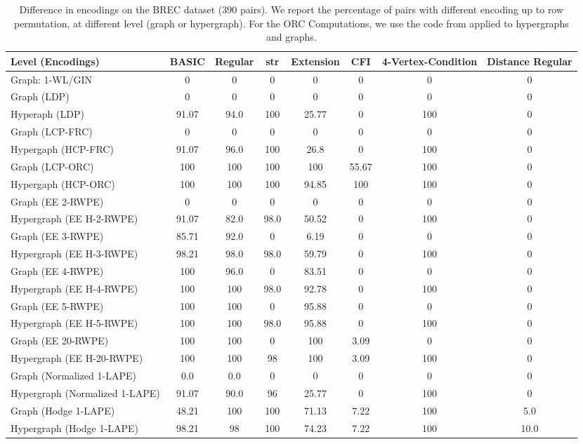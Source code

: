 \begin{table}[H]
\centering
\tiny
\begin{tabular}{|l|c|c|c|c|c|c|c|}
\hline
\textbf{Level (Encodings)} & \textbf{BASIC} & \textbf{Regular} & \textbf{str} & \textbf{Extension} & \textbf{CFI} & \textbf{4-Vertex-Condition} & \textbf{Distance Regular} \\
\hline
Graph: 1-WL/GIN & 0 & 0 & 0 & 0 & 0 & 0 & 0 \\
\hline
Graph (LDP) & 0 & 0 & 0 & 0 & 0 & 0 & 0  \\
Hyperaph (LDP) & 91.07 & 94.0  & 100 & 25.77  & 0 & 100 & 0  \\
\hline
Graph (LCP-FRC) & 0 & 0 & 0 & 0 & 0 & 0 & 0 \\
Hypergaph (HCP-FRC) & 91.07 & 96.0  & 100 & 26.8 & 0 & 100 & 0  \\
\hline
Graph (LCP-ORC) &  100 & 100 & 100 & 100 & 55.67 & 100 &0  \\
Hypergaph (HCP-ORC) & 100 & 100   & 100  & 94.85  & 100  &  100 &   0 \\
\hline
Graph (EE 2-RWPE) & 0 & 0 & 0 & 0 & 0 & 0 & 0 \\
Hypergraph (EE H-2-RWPE) & 91.07 & 82.0  & 98.0 & 50.52 & 0  & 100 & 0 \\
\hline
Graph (EE 3-RWPE) &  85.71 & 92.0 & 0  & 6.19  & 0  &  0& 0  \\
Hypergraph (EE H-3-RWPE) & 98.21  & 98.0   & 98.0  & 59.79  & 0  & 100  & 0  \\
\hline
Graph (EE 4-RWPE) & 100  & 96.0  &  0  & 83.51 & 0  & 0 &  0\\
Hypergraph (EE H-4-RWPE) & 100   & 100   & 98.0   & 92.78  & 0   & 100   & 0  \\
\hline
Graph (EE 5-RWPE) & 100  &  100 & 0   & 95.88  & 0  & 0 & 0 \\
Hypergraph (EE H-5-RWPE) & 100   & 100  &  98.0  &  95.88  & 0  & 100  & 0  \\
\hline
Graph (EE 20-RWPE)        & 100  &  100 & 0   & 100 &  3.09  & 0 & 0 \\
Hypergraph (EE H-20-RWPE) & 100   & 100  & 98   & 100   &  3.09  & 100  & 0  \\
\hline
Graph (Normalized 1-LAPE) & 0.0 & 0.0   & 0  &  0 & 0  & 0 & 0\\
Hypergraph (Normalized 1-LAPE) & 91.07 & 90.0   & 96  &  25.77 &   0 & 100 & 0 \\
\hline
Graph (Hodge 1-LAPE) & 48.21 &  100 & 100  & 71.13  &  7.22 & 100 & 5.0  \\
Hypergraph (Hodge 1-LAPE) & 98.21 & 98   & 100  &  74.23 & 7.22  & 100 & 10.0\\
\hline
\end{tabular}
\caption{Difference in encodings on the BREC dataset (390 pairs). We report the percentage of pairs with different encoding up to row permutation, at different level (graph or hypergraph). For the ORC Computations, we use the code from \citep{coupette2022ollivier} applied to hypergraphs and graphs.}\label{tab:long-table-encodings}
\end{table}

